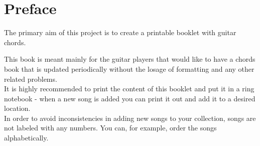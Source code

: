 \section*{Preface}
The primary aim of this project is to create a printable booklet with guitar chords.\par
This book is meant mainly for the guitar players that would like to have a chords book that is updated periodically without the losage of formatting and any other related problems.\\
It is highly recommended to print the content of this booklet and put it in a ring notebook - when a new song is added you can print it out and add it to a desired location.\\
In order to avoid inconsistencies in adding new songs to your collection, songs are not labeled with any numbers. You can, for example, order the songs alphabetically.\par
\clearpage
